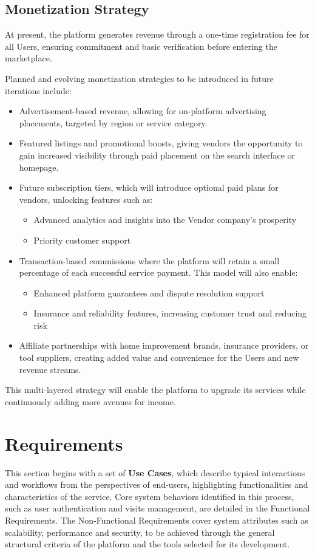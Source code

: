 \documentclass[11pt,a4paper]{article}
\begin{document}
\subsection{Monetization Strategy}

At present, the platform generates revenue through a one-time
registration fee for all Users, ensuring commitment and basic
verification before entering the marketplace.

Planned and evolving monetization strategies to be introduced in
future iterations include:

\begin{itemize}
  \item Advertisement-based revenue, allowing for on-platform
    advertising placements, targeted by region or service category.
  \item Featured listings and promotional boosts, giving vendors the
    opportunity to gain increased visibility through paid placement
    on the search interface or homepage.
  \item Future subscription tiers, which will introduce optional paid
    plans for vendors, unlocking features such as:
    \begin{itemize}
      \item Advanced analytics and insights into the Vendor company's prosperity
      \item Priority customer support
    \end{itemize}
  \item Transaction-based commissions where the platform will retain
    a small percentage of each successful service payment. This model
    will also enable:
    \begin{itemize}
      \item Enhanced platform guarantees and dispute resolution support
      \item Insurance and reliability features, increasing customer
        trust and reducing risk
    \end{itemize}
  \item Affiliate partnerships with home improvement brands,
    insurance providers, or tool suppliers, creating added value and
    convenience for the Users and new revenue streams.
\end{itemize}

This multi-layered strategy will enable the platform to upgrade its
services while continuously adding more avenues for income.

\section{Requirements}
This section begins with a set of \textbf{Use Cases}, which describe
typical interactions and workflows from the perspectives of
end-users, highlighting functionalities and characteristics of the
service. Core system behaviors identified in this process, such as
user authentication and visits management, are detailed in the
Functional Requirements. The Non-Functional Requirements cover system
attributes such as scalability, performance and security, to be
achieved through the general structural criteria of the platform and
the tools selected for its development.
\end{document}
